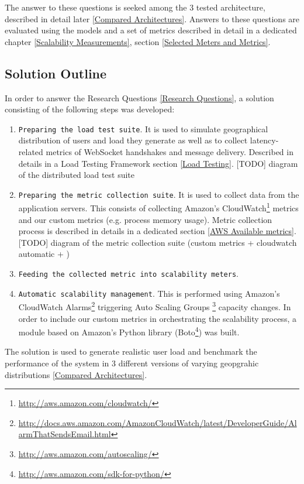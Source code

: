 \documentclass{uvamscse}
\begin{document}
The answer to these questions is seeked among the 3 tested architecture, described in detail later \ref{Compared Architectures}. Answers to these questions are evaluated using the models and a set of metrics described in detail in a dedicated chapter \ref{Scalability Measurements}, section \ref{Selected Meters and Metrics}.

\subsection{Solution Outline}

In order to answer the Research Questions \ref{Research Questions}, a solution consisting of the following steps was developed:
\begin{enumerate}
  \item \texttt{Preparing the load test suite}. It is used to simulate geographical distribution of users and load they generate as well as to collect latency-related metrics of WebSocket handshakes and message delivery. Described in details in a Load Testing Framework section \ref{Load Testing}.
  [TODO] diagram of the distributed load test suite
  \item \texttt{Preparing the metric collection suite}. It is used to collect data from the application servers. This consists of collecting Amazon's CloudWatch\footnote{\url{http://aws.amazon.com/cloudwatch/}} metrics and our custom metrics (e.g. process memory usage). Metric collection process is described in details in a dedicated section \ref{AWS Available metrics}.
  [TODO] diagram of the metric collection suite (custom metrics + cloudwatch automatic + )
  \item \texttt{Feeding the collected metric into scalability meters}.
  \item \texttt{Automatic scalability management}. This is performed using Amazon's CloudWatch Alarms\footnote{\url{http://docs.aws.amazon.com/AmazonCloudWatch/latest/DeveloperGuide/AlarmThatSendsEmail.html}} triggering Auto Scaling Groups \footnote{\url{http://aws.amazon.com/autoscaling/}} capacity changes. In order to include our custom metrics in orchestrating the scalability process, a module based on Amazon's Python library (Boto\footnote{\url{http://aws.amazon.com/sdk-for-python/}}) was built.
\end{enumerate}

The solution is used to generate realistic user load and benchmark the performance of the system in 3 different versions of varying geopgrahic distributions \ref{Compared Architectures}.
\end{document}
